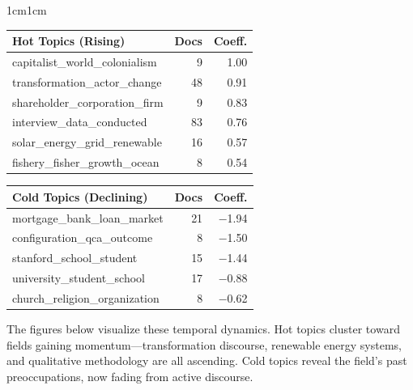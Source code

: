 \documentclass[../main.tex]{subfiles}
\begin{document}
\begin{adjustwidth}{1cm}{1cm}


\begin{center}
\small
\begin{tabular}{@{}lrr@{}}
\toprule
\textbf{Hot Topics (Rising)} & \textbf{Docs} & \textbf{Coeff.} \\
\midrule
capitalist\_world\_colonialism & 9 & 1.00 \\
transformation\_actor\_change & 48 & 0.91 \\
shareholder\_corporation\_firm & 9 & 0.83 \\
interview\_data\_conducted & 83 & 0.76 \\
solar\_energy\_grid\_renewable & 16 & 0.57 \\
fishery\_fisher\_growth\_ocean & 8 & 0.54 \\
\bottomrule
\end{tabular}
\quad
\begin{tabular}{@{}lrr@{}}
\toprule
\textbf{Cold Topics (Declining)} & \textbf{Docs} & \textbf{Coeff.} \\
\midrule
mortgage\_bank\_loan\_market & 21 & $-$1.94 \\
configuration\_qca\_outcome & 8 & $-$1.50 \\
stanford\_school\_student & 15 & $-$1.44 \\
university\_student\_school & 17 & $-$0.88 \\
church\_religion\_organization & 8 & $-$0.62 \\
\bottomrule
\end{tabular}
\label{tab:xray-temporal}
\end{center}

\noindent The figures below visualize these temporal dynamics. Hot topics cluster toward fields gaining momentum---transformation discourse, renewable energy systems, and qualitative methodology are all ascending. Cold topics reveal the field's past preoccupations, now fading from active discourse.

\end{adjustwidth}
\end{document}
